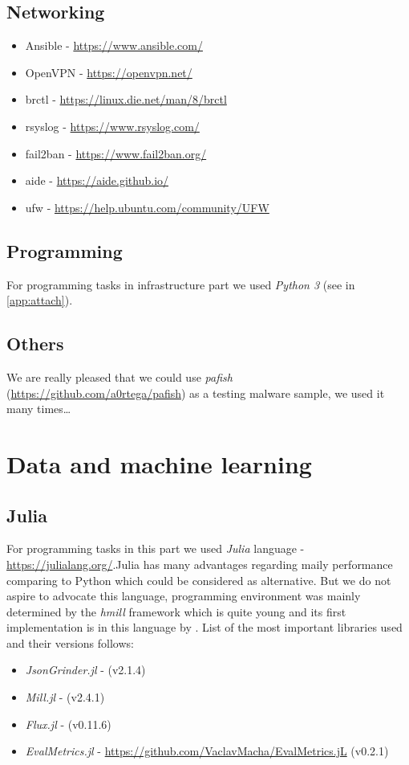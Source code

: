 \subsection*{Networking}
\begin{itemize}
  \item Ansible - \url{https://www.ansible.com/}
  \item OpenVPN - \url{https://openvpn.net/}
  \item brctl - \url{https://linux.die.net/man/8/brctl}
  \item rsyslog - \url{https://www.rsyslog.com/}
  \item fail2ban - \url{https://www.fail2ban.org/}
  \item aide - \url{https://aide.github.io/}
  \item ufw - \url{https://help.ubuntu.com/community/UFW}
\end{itemize}

\subsection*{Programming}
For programming tasks in infrastructure part we used \emph{Python 3} (see in \ref{app:attach}).
\subsection*{Others}
We are really pleased that we could use \emph{pafish} (\url{https://github.com/a0rtega/pafish}) as a testing malware sample, we used it many times\dots

\section*{Data and machine learning}
\subsection*{Julia}
For programming tasks in this part we used \emph{Julia} language - \url{https://julialang.org/}.Julia has many advantages regarding maily performance comparing to Python which could be considered as alternative. But we do not aspire to advocate this language, programming environment was mainly determined by the \emph{hmill} framework which is quite young and its first implementation is in this language by \cite{Mandlik2020}. List of the most important libraries used and their versions follows:
\begin{itemize}
  \item \emph{JsonGrinder.jl} - \cite{Pevny2019} (v2.1.4)
  \item \emph{Mill.jl} - \cite{Pevny2018} (v2.4.1)
  \item \emph{Flux.jl} - \cite{Innes2018a, Innes2018} (v0.11.6)
  \item \emph{EvalMetrics.jl} - \url{https://github.com/VaclavMacha/EvalMetrics.jL} (v0.2.1)
\end{itemize}
